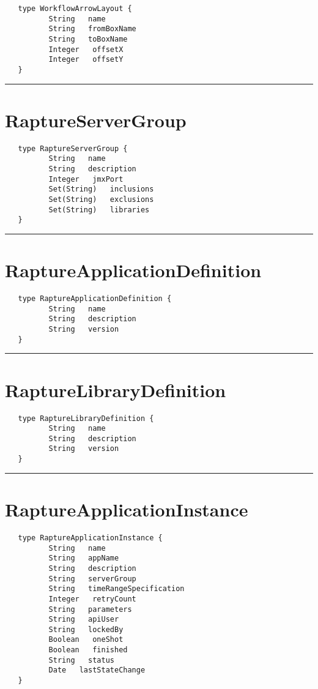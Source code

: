 \begin{Verbatim}
   type WorkflowArrowLayout {
          String   name
          String   fromBoxName
          String   toBoxName
          Integer   offsetX
          Integer   offsetY
   }
\end{Verbatim}

\rule{12cm}{2pt}
\section{RaptureServerGroup}
\label{type:RaptureServerGroup}

\begin{Verbatim}
   type RaptureServerGroup {
          String   name
          String   description
          Integer   jmxPort
          Set(String)   inclusions
          Set(String)   exclusions
          Set(String)   libraries
   }
\end{Verbatim}

\rule{12cm}{2pt}
\section{RaptureApplicationDefinition}
\label{type:RaptureApplicationDefinition}

\begin{Verbatim}
   type RaptureApplicationDefinition {
          String   name
          String   description
          String   version
   }
\end{Verbatim}

\rule{12cm}{2pt}
\section{RaptureLibraryDefinition}
\label{type:RaptureLibraryDefinition}

\begin{Verbatim}
   type RaptureLibraryDefinition {
          String   name
          String   description
          String   version
   }
\end{Verbatim}

\rule{12cm}{2pt}
\section{RaptureApplicationInstance}
\label{type:RaptureApplicationInstance}

\begin{Verbatim}
   type RaptureApplicationInstance {
          String   name
          String   appName
          String   description
          String   serverGroup
          String   timeRangeSpecification
          Integer   retryCount
          String   parameters
          String   apiUser
          String   lockedBy
          Boolean   oneShot
          Boolean   finished
          String   status
          Date   lastStateChange
   }
\end{Verbatim}

